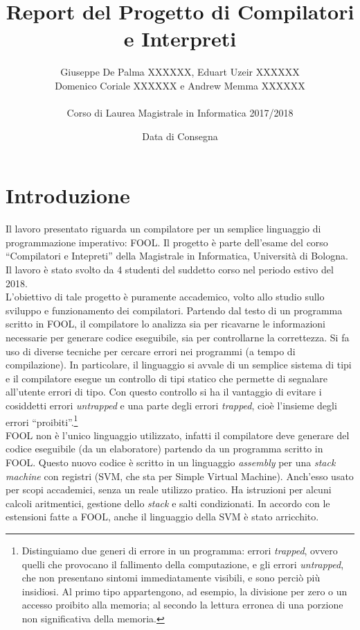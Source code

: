 \documentclass{scrreprt}
\title{Report del Progetto di Compilatori e Interpreti}
\date{Data di Consegna}
\author{Giuseppe De Palma XXXXXX, Eduart Uzeir XXXXXX\\ Domenico Coriale XXXXXX e Andrew Memma XXXXXX\\
\\Corso di Laurea Magistrale in Informatica 2017/2018}
\begin{document}
\maketitle

\tableofcontents

\chapter{Introduzione}
Il lavoro presentato riguarda un compilatore per un semplice linguaggio di programmazione imperativo: FOOL. Il progetto è parte dell'esame del corso ``Compilatori e Intepreti'' della Magistrale in Informatica, Università di Bologna. Il lavoro è stato svolto da 4 studenti del suddetto corso nel periodo estivo del 2018.\\

L'obiettivo di tale progetto è puramente accademico, volto allo studio sullo sviluppo e funzionamento dei compilatori. Partendo dal testo di un programma scritto in FOOL, il compilatore lo analizza sia per ricavarne le informazioni necessarie per generare codice eseguibile, sia per controllarne la correttezza. Si fa uso di diverse tecniche per cercare errori nei programmi (a tempo di compilazione). In particolare, il linguaggio si avvale di un semplice sistema di tipi e il compilatore esegue un controllo di tipi statico che permette di segnalare all'utente errori di tipo. Con questo controllo si ha il vantaggio di evitare i cosiddetti errori \textit{untrapped} e una parte degli errori \textit{trapped}, cioè l'insieme degli errori ``proibiti''.\footnote{Distinguiamo due generi di errore in un programma: errori \textit{trapped}, ovvero quelli che provocano il fallimento della computazione, e gli errori	\textit{untrapped}, che non	presentano sintomi immediatamente visibili, e sono perciò più insidiosi. Al primo tipo appartengono, ad esempio, la divisione per zero o un accesso proibito alla memoria; al secondo la lettura erronea di una porzione non significativa della memoria.}\\

FOOL non è l'unico linguaggio utilizzato, infatti il compilatore deve generare del codice eseguibile (da un elaboratore) partendo da un programma scritto in FOOL. Questo nuovo codice è scritto in un linguaggio \textit{assembly} per una \textit{stack machine} con registri (SVM, che sta per Simple Virtual Machine). Anch'esso usato per scopi accademici, senza un reale utilizzo pratico. Ha istruzioni per alcuni calcoli aritmentici, gestione dello \textit{stack} e salti condizionati. In accordo con le estensioni fatte a FOOL, anche il linguaggio della SVM è stato arricchito.
\end{document}
